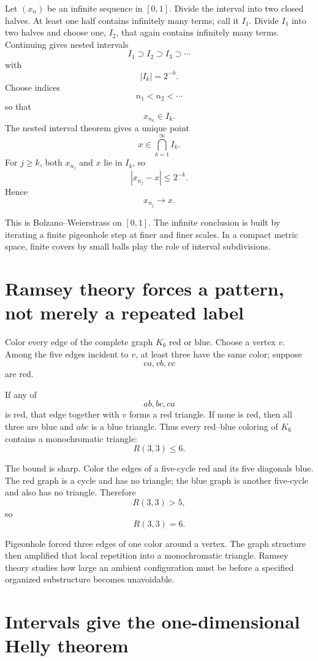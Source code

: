 Let \((x_n)\) be an infinite sequence in \([0,1]\).  Divide the interval into two closed halves.  At least one half contains infinitely many terms; call it \(I_1\).  Divide \(I_1\) into two halves and choose one, \(I_2\), that again contains infinitely many terms.  Continuing gives nested intervals
\[
  I_1\supset I_2\supset I_3\supset\cdots
\]
with
\[
  |I_k|=2^{-k}.
\]
Choose indices
\[
  n_1<n_2<\cdots
\]
so that
\[
  x_{n_k}\in I_k.
\]
The nested interval theorem gives a unique point
\[
  x\in\bigcap_{k=1}^\infty I_k.
\]
For \(j\ge k\), both \(x_{n_j}\) and \(x\) lie in \(I_k\), so
\[
  |x_{n_j}-x|\le2^{-k}.
\]
Hence
\[
  x_{n_j}\to x.
\]

This is Bolzano--Weierstrass on \([0,1]\).  The infinite conclusion is built by iterating a finite pigeonhole step at finer and finer scales.  In a compact metric space, finite covers by small balls play the role of interval subdivisions.

\section{Ramsey theory forces a pattern, not merely a repeated label}

Color every edge of the complete graph \(K_6\) red or blue.  Choose a vertex \(v\).  Among the five edges incident to \(v\), at least three have the same color; suppose
\[
  va,vb,vc
\]
are red.

If any of
\[
  ab,bc,ca
\]
is red, that edge together with \(v\) forms a red triangle.  If none is red, then all three are blue and \(abc\) is a blue triangle.  Thus every red--blue coloring of \(K_6\) contains a monochromatic triangle:
\[
  R(3,3)\le6.
\]

The bound is sharp.  Color the edges of a five-cycle red and its five diagonals blue.  The red graph is a cycle and has no triangle; the blue graph is another five-cycle and also has no triangle.  Therefore
\[
  R(3,3)>5,
\]
so
\[
  \boxed{R(3,3)=6.}
\]

Pigeonhole forced three edges of one color around a vertex.  The graph structure then amplified that local repetition into a monochromatic triangle.  Ramsey theory studies how large an ambient configuration must be before a specified organized substructure becomes unavoidable.

\section{Intervals give the one-dimensional Helly theorem}

